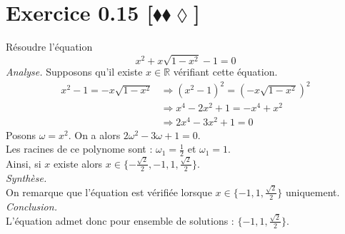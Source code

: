 \documentclass[10pt]{article}
\begin{document}
\section*{Exercice 0.15 [$\blacklozenge\blacklozenge\lozenge$]}
\begin{tcolorbox}[enhanced, width=6in, center, size=fbox, fontupper=\large, drop shadow southwest]
    Résoudre l'équation
    \begin{equation*}
        x^2 + x\sqrt{1-x^2}-1=0
    \end{equation*}
    \emph{Analyse.}
    Supposons qu'il existe $x\in\mathbb{R}$ vérifiant cette équation.
    \begin{align*}
        x^2-1=-x\sqrt{1-x^2} 
        &\Rightarrow (x^2-1)^2=(-x\sqrt{1-x^2})^2\\
        &\Rightarrow x^4 - 2x^2 + 1 = -x^4+x^2\\
        &\Rightarrow 2x^4-3x^2+1=0
    \end{align*}
    Posons $\omega=x^2$. On a alors $2\omega^2-3\omega+1=0$.\\
    Les racines de ce polynome sont : $\omega_1=\frac{1}{2}$ et $\omega_1=1$.\\
    Ainsi, si $x$ existe alors $x\in\{-\frac{\sqrt{2}}{2},-1,1,\frac{\sqrt{2}}{2}\}$.\\[0.25cm]
    \emph{Synthèse.}\\
    On remarque que l'équation est vérifiée lorsque $x\in\{-1,1,\frac{\sqrt{2}}{2}\}$ uniquement.\\[0.25cm]
    \emph{Conclusion.}\\
    L'équation admet donc pour ensemble de solutions : $\{-1,1,\frac{\sqrt{2}}{2}\}$.
\end{tcolorbox}
\end{document}
